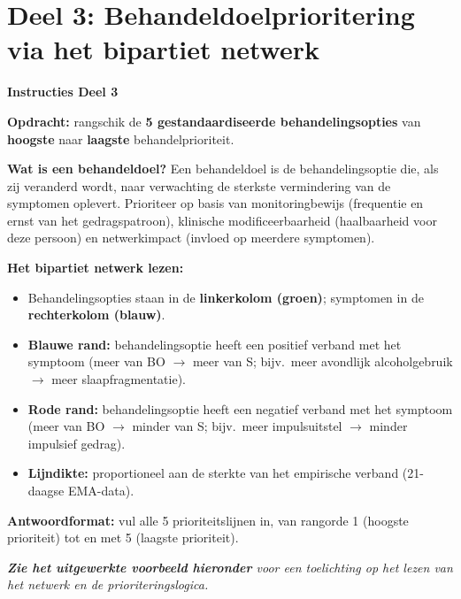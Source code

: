 \documentclass[11pt,a4paper]{article}
\begin{document}
\vspace{0.6em}
\newpage


\section{Deel 3: Behandeldoelprioritering via het bipartiet netwerk}

\begin{tcolorbox}[colback=yellow!5,colframe=GoldAmber,arc=2.5mm,boxrule=0.9pt,
  left=10pt,right=10pt,top=9pt,bottom=9pt]
\textbf{\color{GoldAmber}Instructies Deel 3}

\smallskip\small
\textbf{Opdracht:} rangschik de \textbf{5 gestandaardiseerde behandelingsopties} van
\textbf{hoogste} naar \textbf{laagste} behandelprioriteit.

\textbf{Wat is een behandeldoel?}
Een behandeldoel is de behandelingsoptie die, als zij veranderd wordt, naar verwachting de
sterkste vermindering van de symptomen oplevert. Prioriteer op basis van monitoringbewijs
(frequentie en ernst van het gedragspatroon), klinische modificeerbaarheid
(haalbaarheid voor deze persoon) en netwerkimpact (invloed op meerdere symptomen).

\textbf{Het bipartiet netwerk lezen:}
\begin{itemize}[topsep=2pt,itemsep=1pt]
\item Behandelingsopties staan in de \textbf{linkerkolom (groen)}; symptomen in de \textbf{rechterkolom (blauw)}.
\item \textbf{Blauwe rand:} behandelingsoptie heeft een positief verband met het symptoom
(meer van BO $\rightarrow$ meer van S; bijv.\ meer avondlijk alcoholgebruik $\rightarrow$ meer slaapfragmentatie).
\item \textbf{Rode rand:} behandelingsoptie heeft een negatief verband met het symptoom
(meer van BO $\rightarrow$ minder van S; bijv.\ meer impulsuitstel $\rightarrow$ minder impulsief gedrag).
\item \textbf{Lijndikte:} proportioneel aan de sterkte van het empirische verband
(21-daagse EMA-data).
\end{itemize}

\textbf{Antwoordformat:} vul alle 5 prioriteitslijnen in, van rangorde 1 (hoogste prioriteit)
tot en met 5 (laagste prioriteit).

\medskip
\textit{\textbf{Zie het uitgewerkte voorbeeld hieronder} voor een toelichting op het lezen van het netwerk en de prioriteringslogica.}
\end{tcolorbox}
\end{document}
